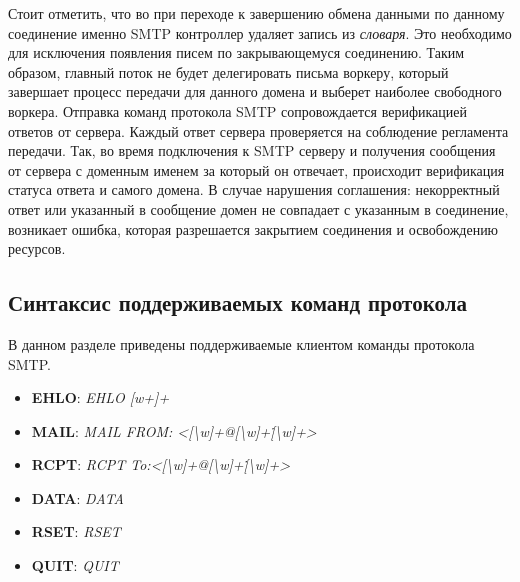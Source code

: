 \documentclass[a4paper,12pt]{report}
\begin{document}
Стоит отметить, что во при переходе к завершению обмена данными по данному соединение именно SMTP контроллер удаляет запись из \textit{словаря}. Это необходимо для исключения появления писем по закрывающемуся соединению. Таким образом, главный поток не будет делегировать письма воркеру, который завершает процесс передачи для данного домена и выберет наиболее свободного воркера.
Отправка команд протокола SMTP сопровождается верификацией ответов от сервера. Каждый ответ сервера проверяется на соблюдение регламента передачи. Так, во время подключения к SMTP серверу и получения сообщения от сервера с доменным именем за который он отвечает, происходит верификация статуса ответа и самого домена. В случае нарушения соглашения: некорректный ответ или указанный в сообщение домен не совпадает с указанным в соединение, возникает ошибка, которая разрешается закрытием соединения и освобождению ресурсов.

\subsection*{Синтаксис поддерживаемых команд протокола}
В данном разделе приведены поддерживаемые клиентом команды протокола SMTP.

\begin{itemize}
    \item \textbf{EHLO}: {\it EHLO [w+]+\/}
    \item \textbf{MAIL}: {\it MAIL FROM: <[\textbackslash w]+@[\textbackslash w]+\.[\textbackslash w]+>\/}
    \item \textbf{RCPT}: {\it RCPT To:<[\textbackslash w]+@[\textbackslash w]+\.[\textbackslash w]+>\/}
    \item \textbf{DATA}: {\it DATA\/}
    \item \textbf{RSET}: {\it RSET\/}
    \item \textbf{QUIT}: {\it QUIT\/}
\end{itemize}

\end{document}
